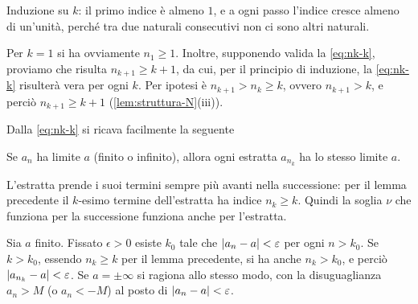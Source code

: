 \begin{schema}
\end{schema}

\begin{strategia}
Induzione su $k$: il primo indice è almeno $1$, e a ogni passo l'indice cresce almeno di
un'unità, perché tra due naturali consecutivi non ci sono altri naturali.
\end{strategia}

\begin{dimostrazione}
Per $k=1$ si ha ovviamente $n_{1}\ge1$. Inoltre, supponendo valida la \eqref{eq:nk-k},
proviamo che risulta $n_{k+1}\ge k+1$, da cui, per il principio di induzione, la
\eqref{eq:nk-k} risulterà vera per ogni $k$. Per ipotesi è $n_{k+1}>n_{k}\ge k$, ovvero
$n_{k+1}>k$, e perciò $n_{k+1}\ge k+1$ (\cref{lem:struttura-N}(iii)).
\end{dimostrazione}

Dalla \eqref{eq:nk-k} si ricava facilmente la seguente

\begin{proposizione}\label{prop:estratta-limite}
Se $a_{n}$ ha limite $a$ (finito o infinito), allora ogni estratta $a_{n_{k}}$ ha lo
stesso limite $a$.
\end{proposizione}

\begin{schema}
\end{schema}

\begin{strategia}
L'estratta prende i suoi termini sempre più avanti nella successione: per il lemma
precedente il $k$-esimo termine dell'estratta ha indice $n_{k}\ge k$. Quindi la soglia
$\nu$ che funziona per la successione funziona anche per l'estratta.
\end{strategia}

\begin{dimostrazione}
Sia $a$ finito. Fissato $\epsilon>0$ esiste $k_{0}$ tale che $\lvert a_{n}-a\rvert<\varepsilon$ per
ogni $n>k_{0}$. Se $k>k_{0}$, essendo $n_{k}\ge k$ per il lemma precedente, si ha anche
$n_{k}>k_{0}$, e perciò $\lvert a_{n_{k}}-a\rvert<\varepsilon$. Se $a=\pm\infty$ si ragiona allo
stesso modo, con la disuguaglianza $a_{n}>M$ (o $a_{n}<-M$) al posto di
$\lvert a_{n}-a\rvert<\varepsilon$.
\end{dimostrazione}

